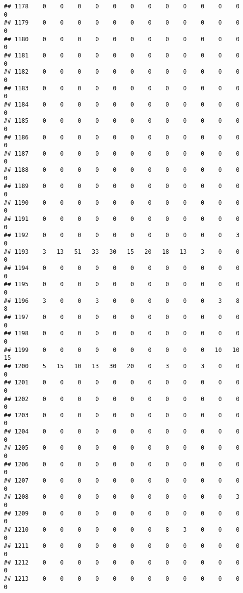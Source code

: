 \documentclass[]{article}
\begin{document}
\begin{verbatim}
## 1178    0    0    0    0    0    0    0    0    0    0    0    0    0
## 1179    0    0    0    0    0    0    0    0    0    0    0    0    0
## 1180    0    0    0    0    0    0    0    0    0    0    0    0    0
## 1181    0    0    0    0    0    0    0    0    0    0    0    0    0
## 1182    0    0    0    0    0    0    0    0    0    0    0    0    0
## 1183    0    0    0    0    0    0    0    0    0    0    0    0    0
## 1184    0    0    0    0    0    0    0    0    0    0    0    0    0
## 1185    0    0    0    0    0    0    0    0    0    0    0    0    0
## 1186    0    0    0    0    0    0    0    0    0    0    0    0    0
## 1187    0    0    0    0    0    0    0    0    0    0    0    0    0
## 1188    0    0    0    0    0    0    0    0    0    0    0    0    0
## 1189    0    0    0    0    0    0    0    0    0    0    0    0    0
## 1190    0    0    0    0    0    0    0    0    0    0    0    0    0
## 1191    0    0    0    0    0    0    0    0    0    0    0    0    0
## 1192    0    0    0    0    0    0    0    0    0    0    0    3    0
## 1193    3   13   51   33   30   15   20   18   13    3    0    0    0
## 1194    0    0    0    0    0    0    0    0    0    0    0    0    0
## 1195    0    0    0    0    0    0    0    0    0    0    0    0    0
## 1196    3    0    0    3    0    0    0    0    0    0    3    8    8
## 1197    0    0    0    0    0    0    0    0    0    0    0    0    0
## 1198    0    0    0    0    0    0    0    0    0    0    0    0    0
## 1199    0    0    0    0    0    0    0    0    0    0   10   10   15
## 1200    5   15   10   13   30   20    0    3    0    3    0    0    0
## 1201    0    0    0    0    0    0    0    0    0    0    0    0    0
## 1202    0    0    0    0    0    0    0    0    0    0    0    0    0
## 1203    0    0    0    0    0    0    0    0    0    0    0    0    0
## 1204    0    0    0    0    0    0    0    0    0    0    0    0    0
## 1205    0    0    0    0    0    0    0    0    0    0    0    0    0
## 1206    0    0    0    0    0    0    0    0    0    0    0    0    0
## 1207    0    0    0    0    0    0    0    0    0    0    0    0    0
## 1208    0    0    0    0    0    0    0    0    0    0    0    3    0
## 1209    0    0    0    0    0    0    0    0    0    0    0    0    0
## 1210    0    0    0    0    0    0    0    8    3    0    0    0    0
## 1211    0    0    0    0    0    0    0    0    0    0    0    0    0
## 1212    0    0    0    0    0    0    0    0    0    0    0    0    0
## 1213    0    0    0    0    0    0    0    0    0    0    0    0    0

\end{verbatim}
\end{document}
